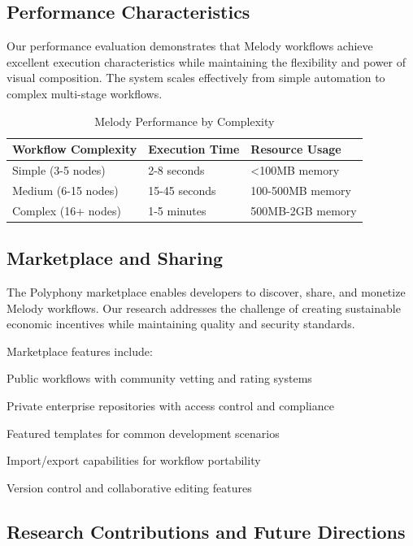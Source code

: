 \subsection*{Performance Characteristics}

Our performance evaluation demonstrates that Melody workflows achieve excellent execution characteristics while maintaining the flexibility and power of visual composition. The system scales effectively from simple automation to complex multi-stage workflows.

\begin{table}[ht]
\centering
\begin{tabular}{@{}lll@{}}
\toprule
\textbf{Workflow Complexity} & \textbf{Execution Time} & \textbf{Resource Usage} \\
\midrule
Simple (3-5 nodes) & 2-8 seconds & <100MB memory \\
Medium (6-15 nodes) & 15-45 seconds & 100-500MB memory \\
Complex (16+ nodes) & 1-5 minutes & 500MB-2GB memory \\
\bottomrule
\end{tabular}
\caption{Melody Performance by Complexity}
\end{table}

\subsection*{Marketplace and Sharing}

The Polyphony marketplace enables developers to discover, share, and monetize Melody workflows. Our research addresses the challenge of creating sustainable economic incentives while maintaining quality and security standards.

Marketplace features include:

\begin{compactlist}
    \item Public workflows with community vetting and rating systems
    \item Private enterprise repositories with access control and compliance
    \item Featured templates for common development scenarios
    \item Import/export capabilities for workflow portability
    \item Version control and collaborative editing features
\end{compactlist}

\subsection*{Research Contributions and Future Directions}

